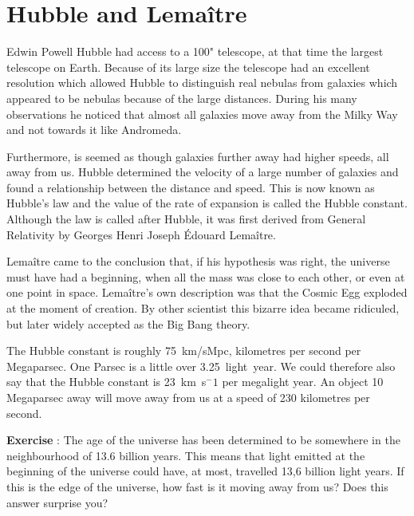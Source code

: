 \section{Hubble and Lema\^itre}
Edwin Powell Hubble had access to a 100" telescope, at that time the largest telescope on Earth. Because of its large size the telescope had an excellent resolution which allowed Hubble to distinguish real nebulas from galaxies which appeared to be nebulas because of the large distances. During his many observations he noticed that almost all galaxies move away from the Milky Way and not towards it like Andromeda.

Furthermore, is seemed as though galaxies further away had higher speeds, all away from us. Hubble determined the velocity of a large number of galaxies and found a relationship between the distance and speed. This is now known as Hubble's law and the value of the rate of expansion is called the Hubble constant. Although the law is called after Hubble, it was first derived from General Relativity by Georges Henri Joseph \'Edouard Lema\^itre.

Lema\^itre came to the conclusion that, if his hypothesis was right, the universe must have had a beginning, when all the mass was close to each other, or even at one point in space. Lema\^itre's own description was that the Cosmic Egg exploded at the moment of creation. By other scientist this bizarre idea became ridiculed, but later widely accepted as the Big Bang theory.

The Hubble constant is roughly 75~km/sMpc, kilometres per second per Megaparsec. One Parsec is a little over 3.25~light~year. We could therefore also say that the Hubble constant is 23~km~s$^-1$ per megalight year. An object 10 Megaparsec away will move away from us at a speed of 230 kilometres per second.

\begin{shaded}
\textbf{Exercise \theExercise {}} : The age of the universe has been determined to be somewhere in the neighbourhood of 13.6 billion years. This means that light emitted at the beginning of the universe could have, at most, travelled 13,6 billion light years. If this is the edge of the universe, how fast is it moving away from us? Does this answer surprise you?\end{shaded}

